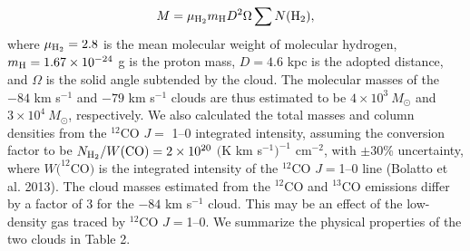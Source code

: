 \documentclass[onecolumn]{pasj01}
\begin{document}
{{{{{\begin{eqnarray}
M =  \mu_{\rm H_2} m_{\rm H} D^2 \Omega \sum N(\rm H_2),
\label{eq:75}
\end{eqnarray}
where $\mu_{\rm H_2}=2.8$ is the mean molecular weight {of molecular hydrogen}, $m_{\rm H}=1.67\times 10^{-24}$ g is the proton mass, $D=4.6 $ kpc is {the} adopted {distance}, and $\Omega$ is the solid angle {subtended by} the cloud.
{The molecular masses of the $-84$ km s$^{-1}$ and $-79$ km s$^{-1}$ {clouds} are {thus} estimated {to be} $4\times 10^3\ M_{\odot}$ and $3\times 10^4\ M_{\odot}$, respectively. }
{We also calculated the total masses and column densities} from the $^{12}$CO $J=$ 1--0 integrated intensity, assuming the {conversion factor} {to be} {$N_{\rm H_2}/W({\rm CO}) = 2 \times 10^{20}$ $($K km s$^{-1})^{-1}$ cm$^{-2}$, with $\pm 30$\% uncertainty{, where $W(^{12}$CO$)$ is the integrated intensity of the $^{12}$CO $J=$1--0 line} (Bolatto et al. 2013).
The cloud masses estimated from {the} $^{12}$CO and $^{13}$CO emissions {differ by a} factor {of} 3 for the $-84$ km s$^{-1}$ cloud.
This may be an effect of the low-density gas traced by $^{12}$CO $J=$1--0.}
We summarize the physical properties of the two clouds {in} Table 2. 

}}}}}
\end{document}

